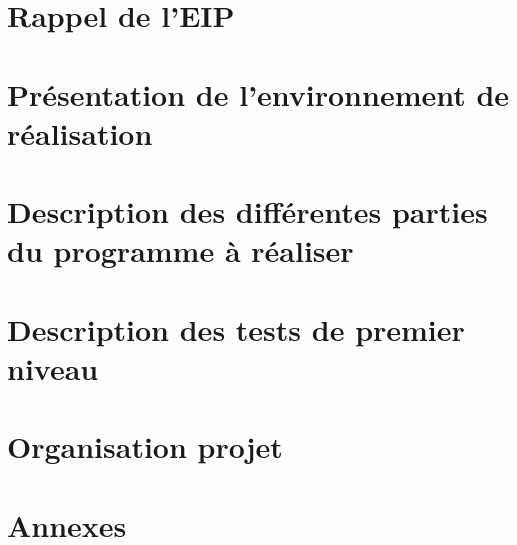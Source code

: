 \documentclass[12pt]{report}
\begin{document}
\tableofcontents
{}
\thispagestyle{empty}

\chapter{Rappel de l'EIP}
\thispagestyle{EIP} %
\setcounter{page}{1} %



\chapter{Présentation de l'environnement de réalisation}
\thispagestyle{EIP} %








\chapter{Description des différentes parties du programme à réaliser}
\thispagestyle{EIP} %


\chapter{Description des tests de premier niveau}
\thispagestyle{EIP} %


\chapter{Organisation projet}
\thispagestyle{EIP} %


\chapter{Annexes}
\thispagestyle{EIP} %

\end{document}
